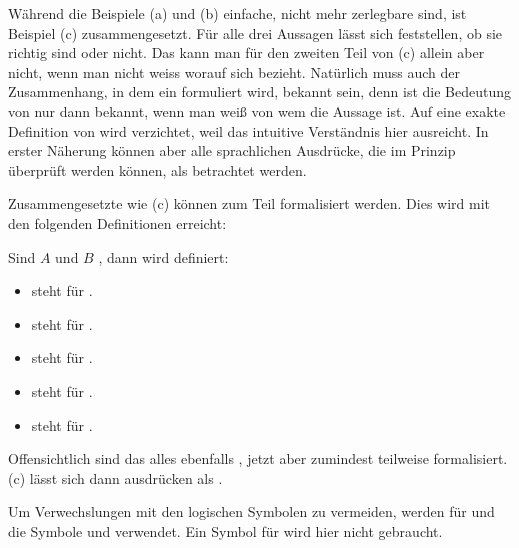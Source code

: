 Während die Beispiele (a) und (b) einfache, nicht mehr zerlegbare  sind, ist Beispiel (c) zusammengesetzt.
Für alle drei Aussagen lässt sich feststellen, ob sie richtig sind oder nicht.
Das kann man für den zweiten Teil von (c) allein aber nicht, wenn man nicht weiss worauf sich  bezieht.
Natürlich muss auch der Zusammenhang, in dem ein  formuliert wird, bekannt sein, denn \textzB ist die Bedeutung von  nur dann bekannt, wenn man weiß von wem die Aussage ist.
Auf eine exakte Definition von  wird verzichtet, weil das intuitive Verständnis hier ausreicht.
In erster Näherung können aber alle sprachlichen Ausdrücke, die im Prinzip überprüft werden können, als  betrachtet werden.

Zusammengesetzte  wie (c) können zum Teil formalisiert werden.
Dies wird mit den folgenden Definitionen erreicht:

Sind $A$ und $B$ , dann wird definiert:
\begin{itemize}
	
	\item {} steht für
	.
	
	\item {} steht für
	.
	
	\item {} steht für
	.
	
	\item {} steht für
	.
	
	\item {} steht für
	.
	
\end{itemize}

Offensichtlich sind das alles ebenfalls , jetzt aber zumindest teilweise formalisiert.
(c) lässt sich dann ausdrücken als .

Um Verwechslungen mit den logischen Symbolen zu vermeiden, werden für  und  die Symbole \symqt{$\metaund$} und \symqt{$\metaoder$} verwendet.
Ein Symbol für  wird hier nicht gebraucht.

